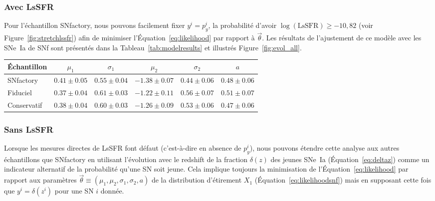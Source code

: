 \documentclass[../main/main.tex]{subfiles}
\begin{document}
\subsubsection*{Avec LsSFR}\label{sssec:lssfr}

Pour l'échantillon SNfactory, nous pouvons facilement fixer $y^i = p_y^i$, la
probabilité d'avoir $\log(\mathrm{LsSFR}) \geq -10,82$ (voir
Figure~\ref{fig:stretchlssfr}) afin de minimiser l'Équation~\ref{eq:likelihood}
par rapport à $\overrightarrow{\theta}$. Les résultats de l'ajustement de ce
modèle avec les SNe~Ia de SNf sont présentés dans la
Tableau~\ref{tab:modelresults} et illustrés Figure~\ref{fig:evol_all}.

\begin{table*}
    \centering
    \caption[Valeurs des paramètres du modèle d'étirement de base selon
    l'échantillon]{Valeurs des paramètres issus des meilleurs ajustements du
        modèle de distribution de l'étirement de base lorsqu'il est
        appliqué à l'ensemble de données de SNfactory seulement (114 SNe~Ia), à
        l'échantillon fiduciel (569 SNe~Ia) ou à l'échantillon conservatif
    (422).}
    \label{tab:modelresults}
    \begin{tabular}{lccccc}
        \toprule
        Échantillon & $\mu_1$             & $\sigma_1$
                    & $\mu_2$             & $\sigma_2$
                    & $a$ \\
        \midrule
        SNfactory   & $ 0.41 \pm 0.05$    & $0.55 \pm 0.04$
                    & $-1.38 \pm 0.07$    & $0.44 \pm 0.06$
                    & $ 0.48 \pm 0.06$ \\
        Fiduciel    & $ 0.37 \pm 0.04$    & $0.61 \pm 0.03$
                    & $-1.22 \pm 0.11$    & $0.56 \pm 0.07$
                    & $ 0.51 \pm 0.07$ \\
        Conservatif & $ 0.38 \pm 0.04$    & $0.60 \pm 0.03$
                    & $-1.26 \pm 0.09$    & $0.53 \pm 0.06$
                    & $ 0.47 \pm 0.06$ \\
        \bottomrule
    \end{tabular}
\end{table*}

\subsubsection*{Sans LsSFR}\label{sssec:z}

Lorsque les mesures directes de LsSFR font défaut (c'est-à-dire en absence de
$p_y^i$), nous pouvons étendre cette analyse aux autres échantillons que
SNfactory en utilisant l'évolution avec le redshift de la fraction $\delta(z)$
des jeunes SNe~Ia (Équation~\ref{eq:deltaz}) comme un indicateur alternatif de
la probabilité qu'une SN soit jeune. Cela implique toujours la minimisation de
l'Équation~\ref{eq:likelihood} par rapport aux paramètres 
$\overrightarrow{\theta}\equiv(\mu_1, \mu_2, \sigma_1, \sigma_2, a)$ de la
distribution d'étirement $X_1$ (Équation~\ref{eq:likelihoodsnf}) mais en
supposant cette fois que $y^i = \delta(z^i)$ pour une SN $i$ donnée.
\end{document}
